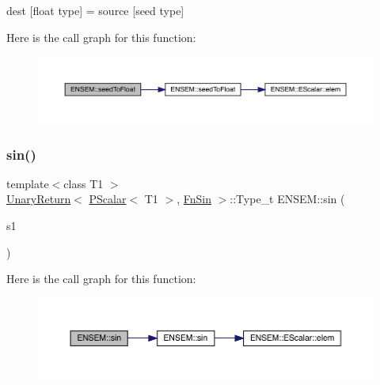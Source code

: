 dest \mbox{[}float type\mbox{]} = source \mbox{[}seed type\mbox{]} 

Here is the call graph for this function\+:\nopagebreak
\begin{figure}[H]
\begin{center}
\leavevmode
\includegraphics[width=350pt]{db/dcc/group__primscalar_ga5a261606d393edcbce00c050e5a5cbd5_cgraph}
\end{center}
\end{figure}
\mbox{\label{group__primscalar_gaa9443eab6edf0a2d0c707614f108a8e3}} 
\subsubsection{\texorpdfstring{sin()}{sin()}}
{\footnotesize\ttfamily template$<$class T1 $>$ \\
\mbox{\hyperlink{structENSEM_1_1UnaryReturn}{Unary\+Return}}$<$ \mbox{\hyperlink{classENSEM_1_1PScalar}{P\+Scalar}}$<$ T1 $>$, \mbox{\hyperlink{structENSEM_1_1FnSin}{Fn\+Sin}} $>$\+::Type\+\_\+t E\+N\+S\+E\+M\+::sin (\begin{DoxyParamCaption}\item[{const \mbox{\hyperlink{classENSEM_1_1PScalar}{P\+Scalar}}$<$ T1 $>$ \&}]{s1 }\end{DoxyParamCaption})\hspace{0.3cm}{\ttfamily [inline]}}

Here is the call graph for this function\+:\nopagebreak
\begin{figure}[H]
\begin{center}
\leavevmode
\includegraphics[width=350pt]{db/dcc/group__primscalar_gaa9443eab6edf0a2d0c707614f108a8e3_cgraph}
\end{center}
\end{figure}
\mbox{\label{group__primscalar_ga07f86503a0138d56e1948dd554ec3e10}} 
